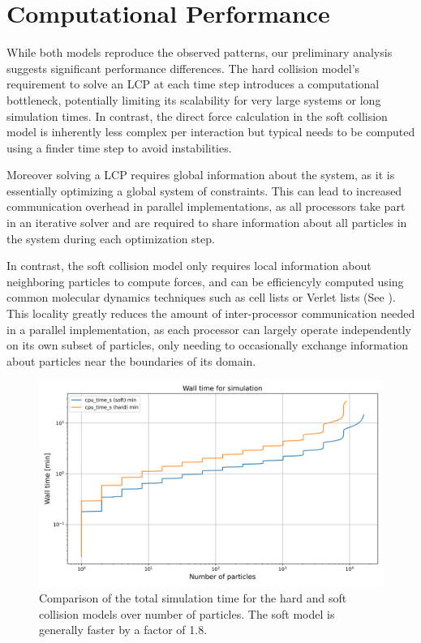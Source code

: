 \documentclass[conference]{IEEEtran}
\begin{document}
\newpage

\section{Computational Performance}

While both models reproduce the observed patterns, our preliminary analysis suggests significant performance differences. The hard collision model's requirement to solve an LCP at each time step introduces a computational bottleneck, potentially limiting its scalability for very large systems or long simulation times. In contrast, the direct force calculation in the soft collision model is inherently less complex per interaction but typical needs to be computed using a finder time step to avoid instabilities.


Moreover solving a LCP requires global information about the system, as it is essentially optimizing a global system of constraints. This can lead to increased communication overhead in parallel implementations, as all processors take part in an iterative solver and are required to share information about all particles in the system during each optimization step.


In contrast, the soft collision model only requires local information about neighboring particles to compute forces, and can be efficiencyly computed using common molecular dynamics techniques such as cell lists or Verlet lists (See \cite{Gratl2019}). This locality greatly reduces the amount of inter-processor communication needed in a parallel implementation, as each processor can largely operate independently on its own subset of particles, only needing to occasionally exchange information about particles near the boundaries of its domain.


\begin{figure}
    \centering
    \includegraphics[width=\linewidth]{figures/comparisons/wall_time_simulation.png}
    \caption{Comparison of the total simulation time for the hard and soft collision models over number of particles. The soft model is generally faster by a factor of 1.8.}
    \label{figure:wall_time_simulation}
\end{figure}
\end{document}
